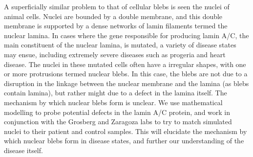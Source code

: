 A superficially similar problem to that of cellular blebs is seen the nuclei of animal cells. Nuclei are bounded by a double membrane, and this double membrane is supported by a dense networks of lamin filaments termed the nuclear lamina. In cases where the gene responsible for producing lamin A/C, the main constituent of the nuclear lamina, is mutated, a  variety of disease states may ensue, including extremely severe diseases such as progeria and heart disease. The nuclei in these mutated cells often have a irregular shapes, with one or more protrusions termed nuclear blebs. In this case, the blebs are not due to a disruption in the linkage between the nuclear membrane and the lamina  (as blebs contain lamina), but rather might due to a defect in the lamina itself. The mechanism by which nuclear blebs form is unclear. We use mathematical modelling to probe potential defects in the lamin A/C protein, and work in conjunction with the Grosberg and Zaragoza labs to try to match simulated nuclei to their patient and control samples. This will elucidate the mechanism by which nuclear blebs form in disease states, and further our understanding of the disease itself. 






  